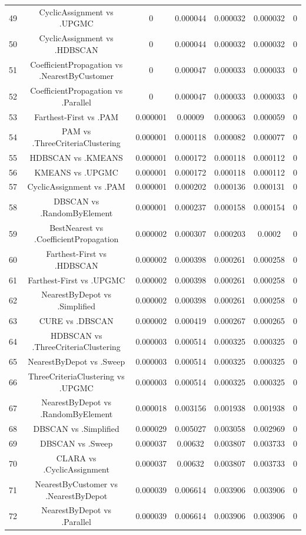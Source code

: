 \documentclass[a4paper,10pt]{article}
\begin{document}
\begin{landscape}
\begin{table}[!htp]
\begin{tabular}{ccccccc}
49&CyclicAssignment vs .UPGMC&0&0.000044&0.000032&0.000032&0\\
50&CyclicAssignment vs .HDBSCAN&0&0.000044&0.000032&0.000032&0\\
51&CoefficientPropagation vs .NearestByCustomer&0&0.000047&0.000033&0.000033&0\\
52&CoefficientPropagation vs .Parallel&0&0.000047&0.000033&0.000033&0\\
53&Farthest-First vs .PAM&0.000001&0.00009&0.000063&0.000059&0\\
54&PAM vs .ThreeCriteriaClustering&0.000001&0.000118&0.000082&0.000077&0\\
55&HDBSCAN vs .KMEANS&0.000001&0.000172&0.000118&0.000112&0\\
56&KMEANS vs .UPGMC&0.000001&0.000172&0.000118&0.000112&0\\
57&CyclicAssignment vs .PAM&0.000001&0.000202&0.000136&0.000131&0\\
58&DBSCAN vs .RandomByElement&0.000001&0.000237&0.000158&0.000154&0\\
59&BestNearest vs .CoefficientPropagation&0.000002&0.000307&0.000203&0.0002&0\\
60&Farthest-First vs .HDBSCAN&0.000002&0.000398&0.000261&0.000258&0\\
61&Farthest-First vs .UPGMC&0.000002&0.000398&0.000261&0.000258&0\\
62&NearestByDepot vs .Simplified&0.000002&0.000398&0.000261&0.000258&0\\
63&CURE vs .DBSCAN&0.000002&0.000419&0.000267&0.000265&0\\
64&HDBSCAN vs .ThreeCriteriaClustering&0.000003&0.000514&0.000325&0.000325&0\\
65&NearestByDepot vs .Sweep&0.000003&0.000514&0.000325&0.000325&0\\
66&ThreeCriteriaClustering vs .UPGMC&0.000003&0.000514&0.000325&0.000325&0\\
67&NearestByDepot vs .RandomByElement&0.000018&0.003156&0.001938&0.001938&0\\
68&DBSCAN vs .Simplified&0.000029&0.005027&0.003058&0.002969&0\\
69&DBSCAN vs .Sweep&0.000037&0.00632&0.003807&0.003733&0\\
70&CLARA vs .CyclicAssignment&0.000037&0.00632&0.003807&0.003733&0\\
71&NearestByCustomer vs .NearestByDepot&0.000039&0.006614&0.003906&0.003906&0\\
72&NearestByDepot vs .Parallel&0.000039&0.006614&0.003906&0.003906&0\\

\end{tabular}
\end{table}
\end{landscape}
\end{document}
